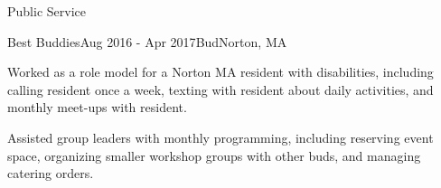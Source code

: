 \documentclass{resume} %
\begin{document}
\begin{rSection}{Public Service}

\begin{rSubsection}{Best Buddies}{Aug 2016 - Apr 2017}{Bud}{Norton, MA}
    \item Worked as a role model for a Norton MA resident with disabilities, including calling resident once a week, texting with resident about daily activities, and monthly meet-ups with resident.
    \item Assisted group leaders with monthly programming, including reserving event space, organizing smaller workshop groups with other buds, and managing catering orders.
\end{rSubsection}

\end{rSection}

\end{document}

